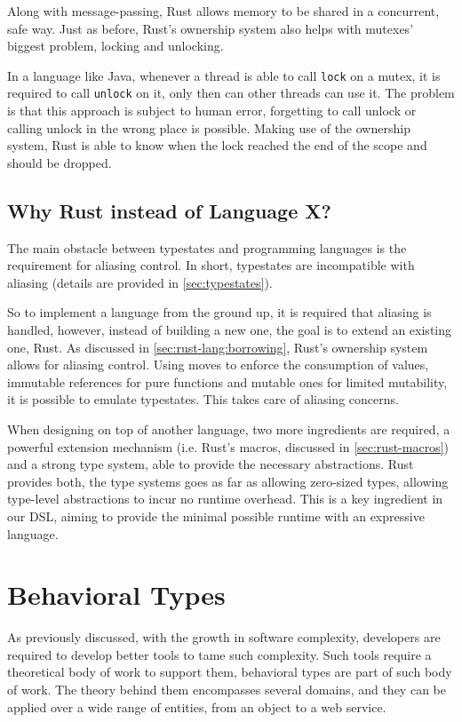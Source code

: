 Along with message-passing, Rust allows memory to be shared in a concurrent, safe way.
Just as before, Rust's ownership system also helps with mutexes' biggest problem, locking and unlocking.

In a language like Java, whenever a thread is able to call \texttt{lock} on a mutex,
it is required to call \texttt{unlock} on it, only then can other threads can use it.
The problem is that this approach is subject to human error,
forgetting to call unlock or calling unlock in the wrong place is possible.
Making use of the ownership system, Rust is able to know when the lock reached the end of the scope and should be dropped.

\subsection{Why Rust instead of Language X?}

The main obstacle between typestates and programming languages is the requirement for aliasing control.
In short, typestates are incompatible with aliasing (details are provided in \autoref{sec:typestates}).

So to implement a language from the ground up, it is required that aliasing is handled,
however, instead of building a new one, the goal is to extend an existing one, Rust.
As discussed in \autoref{sec:rust-lang:borrowing}, Rust's ownership system allows for aliasing control.
Using moves to enforce the consumption of values,
immutable references for pure functions and mutable ones for limited mutability,
it is possible to emulate typestates. This takes care of aliasing concerns.

When designing on top of another language, two more ingredients are required,
a powerful extension mechanism (i.e. Rust's macros, discussed in \autoref{sec:rust-macros})
and a strong type system, able to provide the necessary abstractions.
Rust provides both, the type systems goes as far as allowing zero-sized types,
allowing type-level abstractions to incur no runtime overhead.
This is a key ingredient in our DSL, aiming to provide the minimal possible runtime with an expressive language.

\section{Behavioral Types}\label{sec:behavioral-types}

As previously discussed, with the growth in software complexity, developers are required to develop better tools to tame such complexity.
Such tools require a theoretical body of work to support them, behavioral types are part of such body of work.
The theory behind them encompasses several domains, and they can be applied over a wide range of entities, from an object to a web service.

